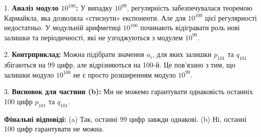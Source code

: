 \documentclass{article}
\begin{document}
1. \textbf{Аналіз модуло \( 10^{100} \):}  
   У випадку \( 10^{99} \), регулярність забезпечувалася теоремою Кармайкла, яка дозволяла «стиснути» експоненти. Але для \( 10^{100} \) цієї регулярності недостатньо. У модульній арифметиці \( 10^{100} \) починають відігравати роль нові залишки та періодичності, які не узгоджуються з модулем \( 10^{99} \).

2. \textbf{Контрприклад:}  
   Можна підібрати значення \( a_i \), для яких залишки \( p_{101} \) та \( q_{101} \) збігаються на 99 цифр, але відрізняються на 100-й. Це пов'язано з тим, що залишки модуло \( 10^{100} \) не є просто розширенням модуло \( 10^{99} \).

3. \textbf{Висновок для частини (b):}  
   Ми не можемо гарантувати однаковість останніх 100 цифр \( p_{101} \) та \( q_{101} \).

\bigskip

\noindent\textbf{Фінальні відповіді:}  
(a) Так, останні 99 цифр завжди однакові.  
(b) Ні, останні 100 цифр гарантувати не можна.
\end{document}
